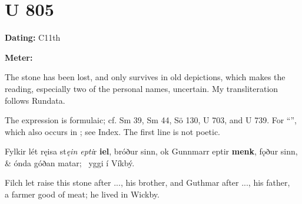 \sectionline

\section{U 805}

\begin{flushright}%
\textbf{Dating:} C11th

\textbf{Meter:} \Fornyrdislag
\end{flushright}%

The stone has been lost, and only survives in old depictions, which makes the reading, especially two of the personal names, uncertain.  My transliteration follows Rundata.

The expression is formulaic; cf. Sm 39, Sm 44, Sö 130, U 703, and U 739.  For “”, which also occurs in \Havamal; see Index.  The first line is not poetic.

\sectionline

\bvg\bva[]%
Fylkir lét ręisa st\emph{ęin epti}r \textbf{iel}, bróður sinn, ok Gunnmarr eptir \textbf{menk}, fǫður sinn, &
ónda góðan matar; \hld\ yggi í Víkbý.\eva

\bvb Filch let raise this stone after ..., his brother, and Guthmar after ..., his father, \\
a farmer good of meat; he lived in Wickby.\evb\evg

\sectionline
